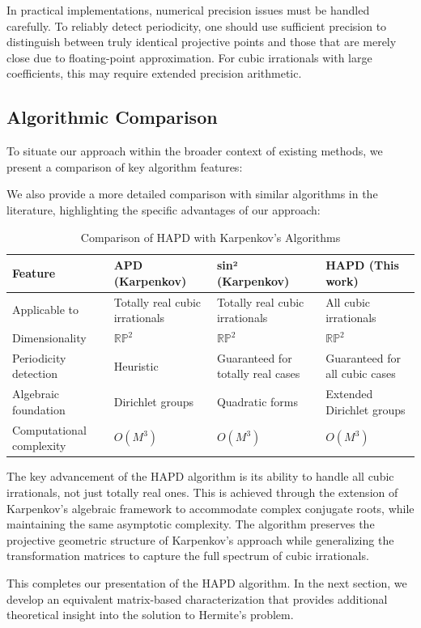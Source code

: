 \begin{remark}
In practical implementations, numerical precision issues must be handled carefully. To reliably detect periodicity, one should use sufficient precision to distinguish between truly identical projective points and those that are merely close due to floating-point approximation. For cubic irrationals with large coefficients, this may require extended precision arithmetic.
\end{remark}

\subsection{Algorithmic Comparison}

To situate our approach within the broader context of existing methods, we present a comparison of key algorithm features:

\begin{table}[ht]
\centering

\end{table}

We also provide a more detailed comparison with similar algorithms in the literature, highlighting the specific advantages of our approach:

\begin{table}[h]
\centering
\caption{Comparison of HAPD with Karpenkov's Algorithms}
\label{tab:algorithm_comparison}
\begin{tabular}{|p{}|p{}|p{}|p{}|}
\hline
\textbf{Feature} & \textbf{APD (Karpenkov)} & \textbf{sin² (Karpenkov)} & \textbf{HAPD (This work)} \\
\hline
Applicable to & Totally real cubic irrationals & Totally real cubic irrationals & All cubic irrationals \\
\hline
Dimensionality & $\mathbb{RP}^2$ & $\mathbb{RP}^2$ & $\mathbb{RP}^2$ \\
\hline
Periodicity detection & Heuristic & Guaranteed for totally real cases & Guaranteed for all cubic cases \\
\hline
Algebraic foundation & Dirichlet groups & Quadratic forms & Extended Dirichlet groups \\
\hline
Computational complexity & $O(M^3)$ & $O(M^3)$ & $O(M^3)$ \\
\hline
\end{tabular}
\end{table}

The key advancement of the HAPD algorithm is its ability to handle all cubic irrationals, not just totally real ones. This is achieved through the extension of Karpenkov's algebraic framework to accommodate complex conjugate roots, while maintaining the same asymptotic complexity. The algorithm preserves the projective geometric structure of Karpenkov's approach while generalizing the transformation matrices to capture the full spectrum of cubic irrationals.

This completes our presentation of the HAPD algorithm. In the next section, we develop an equivalent matrix-based characterization that provides additional theoretical insight into the solution to Hermite's problem.
